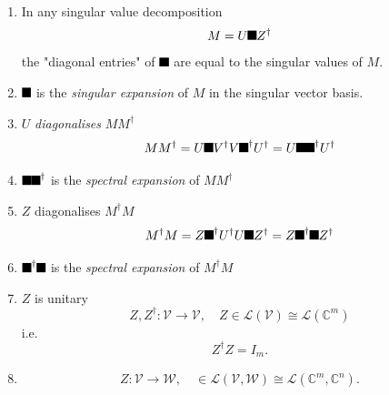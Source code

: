 \documentclass[aps,preprint]{revtex4}%
\providecommand{\U}[1]{\protect\rule{.1in}{.1in}}
\begin{document}
\begin{enumerate}
\item In any singular value decomposition%
\begin{equation}
M=U\U{3a3} Z^{\dagger}%
\end{equation}
the "diagonal entries" of $\U{3a3} $ are equal to the singular values of $M$.

\item $\U{3a3} $ is the \emph{singular expansion} of $M$ in the singular
vector basis.

\item $U$ \emph{diagonalises} $MM^{\dagger}$
\begin{equation}
MM^{\dagger}=U\U{3a3} V^{\dagger}V\U{3a3} ^{\dagger}U^{\dagger}=U\U{3a3}
\U{3a3} ^{\dagger}U^{\dagger}%
\end{equation}


\item $\U{3a3} \U{3a3} ^{\dagger}$ is the \emph{spectral expansion} of
$MM^{\dagger}$

\item $Z$ diagonalises $M^{\dagger}M$%
\begin{equation}
M^{\dagger}M=Z\U{3a3} ^{\dagger}U^{\dagger}U\U{3a3} Z^{\dagger}=Z\U{3a3}
^{\dagger}\U{3a3} Z^{\dagger}%
\end{equation}


\item $\U{3a3} ^{\dagger}\U{3a3} $ is the \emph{spectral expansion} of
$M^{\dagger}M$

\item $Z$ is unitary
\begin{equation}
Z,Z^{\dagger}:\mathcal{V}\rightarrow\mathcal{V},\quad Z\in\mathcal{L}\left(
\mathcal{V}\right)  \cong\mathcal{L}\left(  \mathbb{C}^{m}\right)
\end{equation}
i.e.
\begin{equation}
Z^{\dagger}Z=I_{m}.
\end{equation}


\item
\begin{equation}
Z:\mathcal{V}\rightarrow\mathcal{W},\quad\in\mathcal{L}\left(  \mathcal{V}%
,\mathcal{W}\right)  \cong\mathcal{L}\left(  \mathbb{C}^{m},\mathbb{C}%
^{n}\right)  .
\end{equation}

\end{enumerate}
\end{document}
